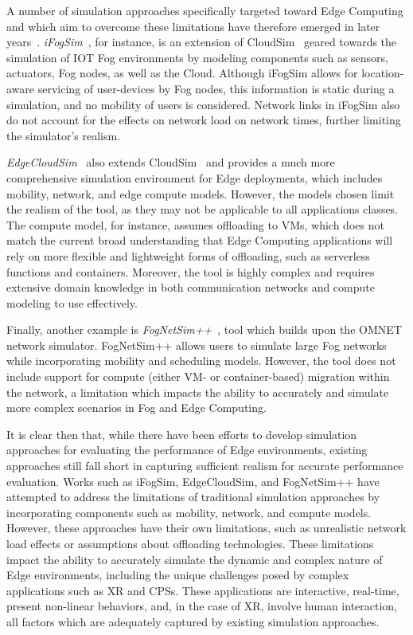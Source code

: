A number of simulation approaches specifically targeted toward Edge Computing and which aim to overcome these limitations have therefore emerged in later years~\cite{svorobej2019simulating}.
\emph{iFogSim}~\cite{gupta2017ifogsim}, for instance, is an extension of CloudSim~\cite{calheiros2011cloudsim} geared towards the simulation of \gls{IOT} Fog environments by modeling components such as sensors, actuators, Fog nodes, as well as the Cloud.
Although iFogSim allows for location-aware servicing of user-devices by Fog nodes, this information is static during a simulation, and no mobility of users is considered.
Network links in iFogSim also do not account for the effects on network load on network times, further limiting the simulator's realism.\@

\emph{EdgeCloudSim}~\cite{sonmez2018edgecloudsim} also extends CloudSim~\cite{calheiros2011cloudsim} and provides a much more comprehensive simulation environment for Edge deployments, which includes mobility, network, and edge compute models.
However, the models chosen limit the realism of the tool, as they may not be applicable to all applications classes.
The compute model, for instance, assumes offloading to \glspl{VM}, which does not match the current broad understanding that Edge Computing applications will rely on more flexible and lightweight forms of offloading, such as serverless functions and containers.
Moreover, the tool is highly complex and requires extensive domain knowledge in both communication networks and compute modeling to use effectively.

Finally, another example is \emph{FogNetSim++}~\cite{qayyum2018fognetsimpp}, tool which builds upon the \acs{OMNET} network simulator.
FogNetSim++ allows users to simulate large Fog networks while incorporating mobility and scheduling models.
However, the tool does not include support for compute (either \gls{VM}- or container-based) migration within the network, a limitation which impacts the ability to accurately and simulate more complex scenarios in Fog and Edge Computing.

It is clear then that, while there have been efforts to develop simulation approaches for evaluating the performance of Edge environments, existing approaches still fall short in capturing sufficient realism for accurate performance evaluation.
Works such as iFogSim, EdgeCloudSim, and FogNetSim++ have attempted to address the limitations of traditional simulation approaches by incorporating components such as mobility, network, and compute models.
However, these approaches have their own limitations, such as unrealistic network load effects or assumptions about offloading technologies.
These limitations impact the ability to accurately simulate the dynamic and complex nature of Edge environments, including the unique challenges posed by complex applications such as \gls{XR} and \glspl{CPS}.
These applications are interactive, real-time, present non-linear behaviors, and, in the case of \gls{XR}, involve human interaction, all factors which are adequately captured by existing simulation approaches.

